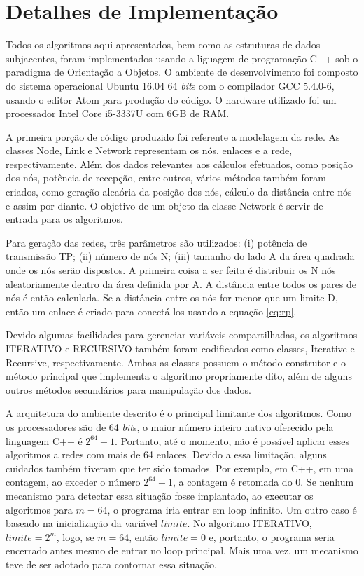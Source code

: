 \section{Detalhes de Implementação}

Todos os algoritmos aqui apresentados, bem como as estruturas de dados subjacentes, foram implementados usando a liguagem de programação C++ sob o paradigma de Orientação a Objetos. O ambiente de desenvolvimento foi composto do sistema operacional Ubuntu 16.04 64 {\it bit}s com o compilador GCC 5.4.0-6, usando o editor Atom para produção do código. O hardware utilizado foi um processador Intel Core i5-3337U com 6GB de RAM.

A primeira porção de código produzido foi referente a modelagem da rede. As classes Node, Link e Network representam os nós, enlaces e a rede, respectivamente. Além dos dados relevantes aos cálculos efetuados, como posição dos nós, potência de recepção, entre outros, vários métodos também foram criados, como geração aleaória da posição dos nós, cálculo da distância entre nós e assim por diante. O objetivo de um objeto da classe Network é servir de entrada para os algoritmos. 

Para geração das redes, três parâmetros são utilizados: (i) potência de transmissão TP; (ii) número de nós N; (iii) tamanho do lado A da área quadrada onde os nós serão dispostos. A primeira coisa a ser feita é distribuir os N nós aleatoriamente dentro da área definida por A. A distância entre todos os pares de nós é então calculada. Se a distância entre os nós for menor que um limite D, então um enlace é criado para conectá-los usando a equação \ref{eq:rp}.  

Devido algumas facilidades para gerenciar variáveis compartilhadas, os algoritmos ITERATIVO e RECURSIVO também foram codificados como classes, Iterative e Recursive, respectivamente. Ambas as classes possuem o método construtor e o método principal que implementa o algoritmo propriamente dito, além de alguns outros métodos secundários para manipulação dos dados.

A arquitetura do ambiente descrito é o principal limitante dos algoritmos. Como os processadores são de 64 {\it bit}s, o maior número inteiro nativo oferecido pela linguagem C++ é $2^{64}-1$. Portanto, até o momento, não é possível aplicar esses algoritmos a redes com mais de 64 enlaces. Devido a essa limitação, alguns cuidados também tiveram que ter sido tomados. Por exemplo, em C++, em uma contagem, ao exceder o número $2^{64}-1$, a contagem é retomada do 0. Se nenhum mecanismo para detectar essa situação fosse implantado, ao executar os algoritmos para $m=64$, o programa iria entrar em loop infinito. Um outro caso é baseado na inicialização da variável $limite$. No algoritmo ITERATIVO, $limite = 2^m$, logo, se $m=64$, então $limite=0$ e, portanto, o programa seria encerrado antes mesmo de entrar no loop principal. Mais uma vez, um mecanismo teve de ser adotado para contornar essa situação.

